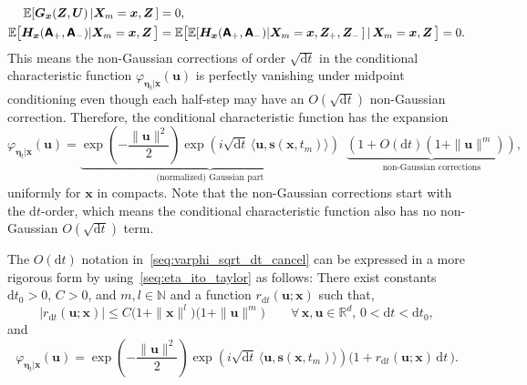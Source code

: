 \begin{equation*}
    \begin{aligned}
    \mathbb{E}[
    \bm{G}_{\bm{x}}(\bm{Z},\bm{U})\,|\bm{X}_m=\bm{x},\bm{Z}\,]
    &=0,
    \\
    \mathbb{E}\big[
    \bm{H}_{\bm{x}}(\boldsymbol{\mathsf{A}}_+,\boldsymbol{\mathsf{A}}_-)|\bm{X}_m=\bm{x},\bm{Z}\,\big]
    &=\mathbb{E}\big[\mathbb{E}[
    \bm{H}_{\bm{x}}(\boldsymbol{\mathsf{A}}_+,\boldsymbol{\mathsf{A}}_-)|\bm{X}_m=\bm{x},\bm{Z}_+,\bm{Z}_-\,]
    \,|\,\bm{X}_m=\bm{x},\bm{Z}\,\big]
    =0.
    \end{aligned}
\end{equation*}
This means the non-Gaussian corrections of order $\sqrt{\mathrm{d}t}$ in the conditional characteristic function $\varphi_{\bm\eta_t|\bm{x}}(\bm{u})$ is perfectly vanishing under midpoint conditioning even though each half-step may have an $O(\sqrt{\mathrm dt})$ non-Gaussian correction. 
Therefore, the conditional characteristic function has the expansion
\begin{equation}
    \varphi_{\bm\eta_t|\bm{x}}(\bm{u})
    =\underbrace{\exp\left(-\frac{\|\bm{u}\|^2}{2} \right)
    \exp\left(i\sqrt{\mathrm{d}t}\,\langle\bm{u},\bm{s}(\bm{x},t_m) \rangle\right)}_{\text{(normalized) Gaussian part}}
    \,\,\,\underbrace{\left(1+O(\mathrm{d}t)(1+\|\bm{u}\|^m)\right)}_{\text{non-Gaussian corrections}},
    \label{seq:varphi_sqrt_dt_cancel}
\end{equation}
uniformly for $\bm{x}$ in compacts. Note that the non-Gaussian corrections start with the $\mathrm dt$-order, which means the conditional characteristic function also has no non-Gaussian $O(\sqrt{\mathrm dt})$ term.

The $O(\mathrm dt)$ notation in~\eqref{seq:varphi_sqrt_dt_cancel} can be expressed in a more rigorous form by using~\eqref{seq:eta_ito_taylor} as follows:
There exist constants $\mathrm{d}t_0>0$, $C>0$, and $m,l\in\mathbb N$
and a function $r_{\mathrm dt}(\bm u;\bm x)$ such that,
\begin{equation}
    | r_{\mathrm dt}(\bm u;\bm x) |
    \le C \big(1+\|\bm x\|^l\big)\big(1+\|\bm u\|^m\big)
    \qquad
    \forall\,\bm x,\bm u\in\mathbb R^d,\,
    0<\mathrm dt<\mathrm dt_0,
    \label{seq:r_dt_bound}
\end{equation}
and
\begin{equation}
    \varphi_{\bm\eta_t|\bm x}(\bm u)
    =\exp\left(-\frac{\|\bm u\|^2}{2} \right)
    \exp\left(
    i\sqrt{\mathrm dt}\,\langle \bm u, \bm s(\bm x,t_m)\rangle
    \right)
    \big(1+r_{\mathrm dt}(\bm u;\bm x)\,\mathrm dt\,\big).
    \label{seq:varphi_expansion_remainder}
\end{equation}

